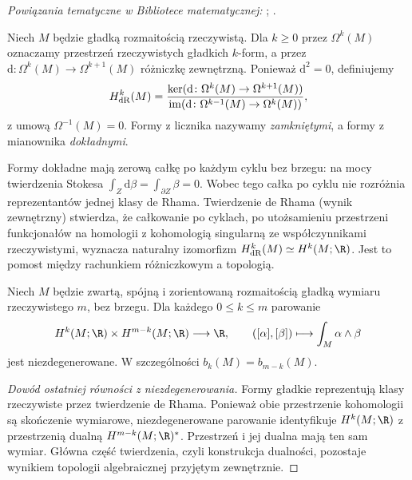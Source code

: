 \noindent\emph{Powiązania tematyczne w Bibliotece matematycznej:} ; .


\begin{definicja}
Niech $M$ będzie gładką rozmaitością rzeczywistą.
Dla $k\ge0$ przez $\Omega^k(M)$ oznaczamy przestrzeń
rzeczywistych gładkich $k$-form, a przez $\mathrm d\colon\Omega^k(M)
\to\Omega^{k+1}(M)$ różniczkę zewnętrzną. Ponieważ $\mathrm d^2=0$,
definiujemy
\[
 H^k_{\rm dR}(M)=\frac{\ker(\mathrm d\colon\Omega^k(M)\to
 \Omega^{k+1}(M))}{\operatorname{im}(\mathrm d\colon
 \Omega^{k-1}(M)\to\Omega^k(M))},
\]
z umową $\Omega^{-1}(M)=0$. Formy z licznika nazywamy
\emph{zamkniętymi}, a formy z mianownika \emph{dokładnymi}.
\end{definicja}

\begin{uwaga}
Formy dokładne mają zerową całkę po każdym cyklu bez brzegu:
na mocy twierdzenia Stokesa $\int_Z\mathrm d\beta
=\int_{\partial Z}\beta=0$. Wobec tego całka po cyklu
nie rozróżnia reprezentantów jednej klasy de Rhama.
Twierdzenie de Rhama (wynik zewnętrzny) stwierdza,
że całkowanie po cyklach, po utożsamieniu przestrzeni
funkcjonałów na homologii z kohomologią singularną
ze współczynnikami rzeczywistymi, wyznacza naturalny
izomorfizm $H^k_{\rm dR}(M)\simeq H^k(M;\R)$.
Jest to pomost między rachunkiem różniczkowym a topologią.
\end{uwaga}

\begin{twierdzenie}
\label{tw:ga10-pd}
Niech $M$ będzie zwartą, spójną i zorientowaną rozmaitością
gładką wymiaru rzeczywistego $m$, bez brzegu.
Dla każdego $0\le k\le m$ parowanie
\[
 H^k(M;\R)\times H^{m-k}(M;\R)\longrightarrow\R,
 \qquad ([\alpha],[\beta])\longmapsto\int_M\alpha\wedge\beta
\]
jest niezdegenerowane. W szczególności $b_k(M)=b_{m-k}(M)$.
\end{twierdzenie}

\begin{proof}[Dowód ostatniej równości z niezdegenerowania]
Formy gładkie reprezentują klasy rzeczywiste przez twierdzenie
de Rhama. Ponieważ obie przestrzenie kohomologii są skończenie
wymiarowe, niezdegenerowane parowanie identyfikuje
$H^k(M;\R)$ z przestrzenią dualną $H^{m-k}(M;\R)^*$.
Przestrzeń i jej dualna mają ten sam wymiar.
Główna część twierdzenia, czyli konstrukcja dualności,
pozostaje wynikiem topologii algebraicznej przyjętym zewnętrznie.
\end{proof}

